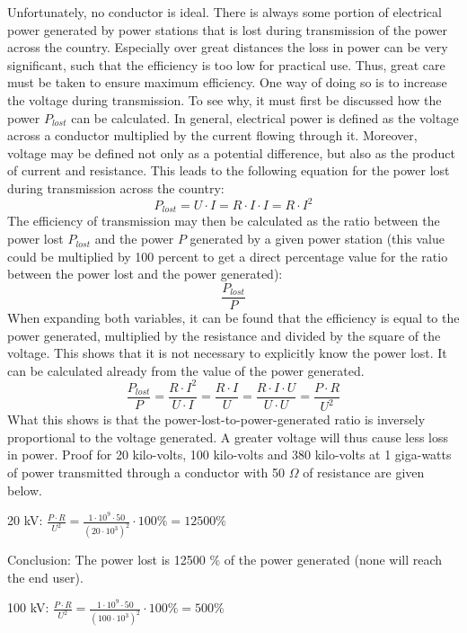 
Unfortunately, no conductor is ideal. There is always some portion of electrical power generated by power stations that is lost during transmission of the power across the country. Especially over great distances the loss in power can be very significant, such that the efficiency is too low for practical use. Thus, great care must be taken to ensure maximum efficiency. One way of doing so is to increase the voltage during transmission. To see why, it must first be discussed how the power $P_{lost}$ can be calculated. In general, electrical power is defined as the voltage across a conductor multiplied by the current flowing through it. Moreover, voltage may be defined not only as a potential difference, but also as the product of current and resistance. This leads to the following equation for the power lost during transmission across the country: $$P_{lost} = U \cdot I = R \cdot I \cdot I = R \cdot I^2$$ The efficiency of transmission may then be calculated as the ratio between the power lost $P_{lost}$ and the power $P$ generated by a given power station (this value could be multiplied by 100 percent to get a direct percentage value for the ratio between the power lost and the power generated): $$\frac{P_{lost}}{P}$$ When expanding both variables, it can be found that the efficiency is equal to the power generated, multiplied by the resistance and divided by the square of the voltage. This shows that it is not necessary to explicitly know the power lost. It can be calculated already from the value of the power generated. $$\frac{P_{lost}}{P} = \frac{R \cdot I^2}{U \cdot I} = \frac{R \cdot I}{U} = \frac{R \cdot I \cdot U}{U \cdot U} = \frac{P \cdot R}{U^2}$$ What this shows is that the power-lost-to-power-generated ratio is inversely proportional to the voltage generated. A greater voltage will thus cause less loss in power. Proof for 20 kilo-volts, 100 kilo-volts and 380 kilo-volts at 1 giga-watts of power transmitted through a conductor with 50 $\Omega$ of resistance are given below.

20 kV: $\frac{P \cdot R}{U^2} = \frac{1 \cdot 10^9 \cdot 50}{(20 \cdot 10^3)^2} \cdot 100\% = 12500 \%$ 

Conclusion: The power lost is 12500 \% of the power generated (none will reach the end user).

\pagebreak

100 kV: $\frac{P \cdot R}{U^2} = \frac{1 \cdot 10^9 \cdot 50}{(100 \cdot 10^3)^2} \cdot 100\% = 500 \%$

